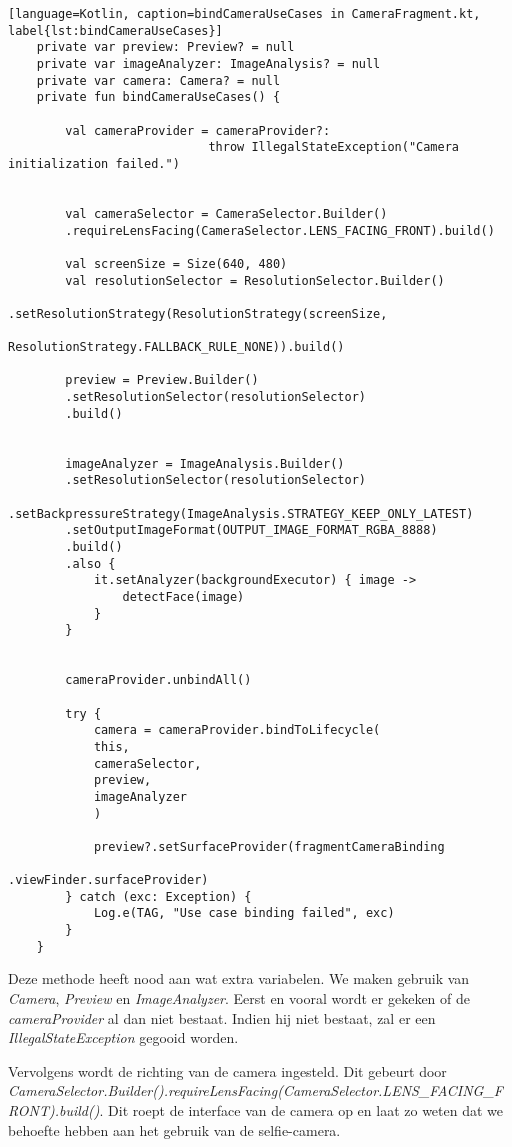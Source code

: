 \begin{lstlisting}[language=Kotlin, caption=bindCameraUseCases in CameraFragment.kt, label{lst:bindCameraUseCases}]
    private var preview: Preview? = null
    private var imageAnalyzer: ImageAnalysis? = null
    private var camera: Camera? = null
    private fun bindCameraUseCases() {
     
        val cameraProvider = cameraProvider?:
                            throw IllegalStateException("Camera initialization failed.")
        
     
        val cameraSelector = CameraSelector.Builder()
        .requireLensFacing(CameraSelector.LENS_FACING_FRONT).build()
        
        val screenSize = Size(640, 480)
        val resolutionSelector = ResolutionSelector.Builder()
                            .setResolutionStrategy(ResolutionStrategy(screenSize,
                            ResolutionStrategy.FALLBACK_RULE_NONE)).build()
        
        preview = Preview.Builder()
        .setResolutionSelector(resolutionSelector)
        .build()
        
        
        imageAnalyzer = ImageAnalysis.Builder()
        .setResolutionSelector(resolutionSelector)
        .setBackpressureStrategy(ImageAnalysis.STRATEGY_KEEP_ONLY_LATEST)
        .setOutputImageFormat(OUTPUT_IMAGE_FORMAT_RGBA_8888)
        .build()
        .also {
            it.setAnalyzer(backgroundExecutor) { image ->
                detectFace(image)
            }
        }
        
        
        cameraProvider.unbindAll()
        
        try {
            camera = cameraProvider.bindToLifecycle(
            this,
            cameraSelector,
            preview,
            imageAnalyzer
            )
            
            preview?.setSurfaceProvider(fragmentCameraBinding
                                            .viewFinder.surfaceProvider)
        } catch (exc: Exception) {
            Log.e(TAG, "Use case binding failed", exc)
        }
    }
\end{lstlisting} 
Deze methode heeft nood aan wat extra variabelen. We maken gebruik van \emph{Camera}, \emph{Preview} en \emph{ImageAnalyzer}. Eerst en vooral wordt er gekeken of de \emph{cameraProvider} al dan niet bestaat. Indien hij niet bestaat, zal er een \emph{IllegalStateException} gegooid worden. 

Vervolgens wordt de richting van de camera ingesteld. Dit gebeurt door \emph{CameraSelector.Builder().requireLensFacing(CameraSelector.LENS\_FACING\_FRONT).build()}. Dit roept de interface van de camera op en laat zo weten dat we behoefte hebben aan het gebruik van de selfie-camera.

